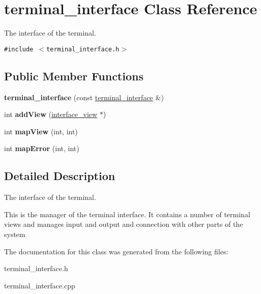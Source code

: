 \hypertarget{classterminal__interface}{
\section{terminal\_\-interface Class Reference}
\label{classterminal__interface}
}
The interface of the terminal.  


{\tt \#include $<$terminal\_\-interface.h$>$}

\subsection*{Public Member Functions}
\begin{CompactItemize}
\item 
\hypertarget{classterminal__interface_63c3bbb2e695d3ebe8a772f57266f713}{
\textbf{terminal\_\-interface} (const \hyperlink{classterminal__interface}{terminal\_\-interface} \&)}
\label{classterminal__interface_63c3bbb2e695d3ebe8a772f57266f713}

\item 
\hypertarget{classterminal__interface_4ca4a68b333ea8de4c81de895e6a1d24}{
int \textbf{addView} (\hyperlink{classinterface__view}{interface\_\-view} $\ast$)}
\label{classterminal__interface_4ca4a68b333ea8de4c81de895e6a1d24}

\item 
\hypertarget{classterminal__interface_f5fcbd865b9d76b579ba7f047e4e7dc3}{
int \textbf{mapView} (int, int)}
\label{classterminal__interface_f5fcbd865b9d76b579ba7f047e4e7dc3}

\item 
\hypertarget{classterminal__interface_8b97bf1a6947ba8c24b93de3d501b4fb}{
int \textbf{mapError} (int, int)}
\label{classterminal__interface_8b97bf1a6947ba8c24b93de3d501b4fb}

\end{CompactItemize}


\subsection{Detailed Description}
The interface of the terminal. 

This is the manager of the terminal interface. It contains a number of terminal views and manages input and output and connection with other parts of the system 

The documentation for this class was generated from the following files:\begin{CompactItemize}
\item 
terminal\_\-interface.h\item 
terminal\_\-interface.cpp\end{CompactItemize}
